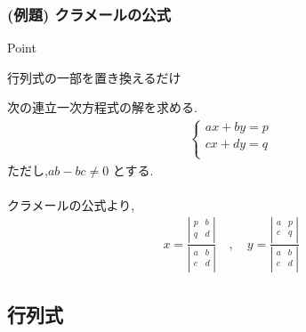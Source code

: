 \documentclass[a4paper]{jsarticle}
\begin{document}
\subsubsection{(例題) クラメールの公式}
\begin{itembox}[l]{Point}
    \begin{center}
        行列式の一部を置き換えるだけ
    \end{center}
\end{itembox}
次の連立一次方程式の解を求める.
\begin{eqnarray*}
    \begin{cases}
        ax+by=p \\
        cx+dy=q \\
    \end{cases}
\end{eqnarray*}
ただし,$ab-bc\neq 0$ とする.\\
\\
クラメールの公式より,
\begin{eqnarray*}
    x
    =\frac{
        \left| \begin{array}{rr}
            p & b \\
            q & d \\
        \end{array} \right|
    }
    {
        \left| \begin{array}{rr}
            a & b \\
            c & d \\
        \end{array} \right|
    }
    \quad ,\quad
    y
    =\frac{
        \left| \begin{array}{rr}
            a & p \\
            c & q \\
        \end{array} \right|
    }
    {
        \left| \begin{array}{rr}
            a & b \\
            c & d \\
        \end{array} \right|
    }
\end{eqnarray*}
\subsection{行列式}
\end{document}
